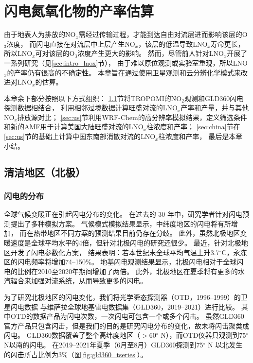 
\chapter{闪电氮氧化物的产率估算} \label{chapter:PE}

由于地表人为排放的NO$_x$需经过传输过程，才能到达自由对流层进而影响该层的O$_3$浓度，
而闪电直接在对流层中上层产生NO$_x$，该层的低温导致LNO$_x$寿命更长，
所以LNO$_x$可对该层的O$_3$浓度产生更大的影响。
然而，尽管前人针对LNO$_x$开展了一系列研究（见\ref{sec:intro_lnox}节），
由于难以原位观测或实验室重现，所以LNO$_x$的产率仍有很高的不确定性。
本章旨在通过使用卫星观测和云分辨化学模式来改进对LNO$_x$的估算。

本章余下部分按照以下方式组织：
\ref{sec:arctic}节将TROPOMI的NO$_2$观测和GLD360闪电探测数据相结合，
利用相邻过境数据计算旺盛对流的LNO$_x$产率和产量，并与其他NO$_x$排放源对比；
\ref{sec:us}节利用WRF-Chem的高分辨率模拟结果，定义筛选条件和新的AMF用于计算美国大陆旺盛对流的LNO$_x$柱浓度和产率；
\ref{sec:china}节在\ref{sec:us}节的基础上计算中国东南部消散对流的LNO$_x$柱浓度和产率，
最后是本章小结。


\section{清洁地区（北极）} \label{sec:arctic}

\subsection{闪电的分布} \label{subsect:lightning_distribution}

全球气候变暖正在引起闪电分布的变化\citep{Reeve.1999,Williams.2005a,Price.2009a}。
在过去的 30 年中，研究学者针对闪电预测提出了多种模拟方案\citep{Price.1992,Price.1997b,Allen.2002,Futyan.2007,Finney.2014,Romps.2014}。
气候模式模拟结果显示，中纬度地区的闪电将有所增加\citep{Michalon.1999,Romps.2014,Luhar.2021}，
而在热带地区不同方案的预测结果目前仍存在分歧\citep{Finney.2018,Romps.2019}。
此外，虽然北极地区变暖速度是全球平均水平的4倍\citep{Rantanen.2022}，但针对北极闪电的研究还很少。
最近，\citet{Chen.2021a}针对北极地区开发了闪电参数化方案，
结果表明：若本世纪末全球平均气温上升3.7$^{\circ}$C，永冻区的闪电频率将增加74--150\%。
地基闪电观测结果显示，北极闪电相对于全球闪电的比例在2010至2020年期间增加了两倍\citep{Holzworth.2021}。
此外，北极地区在夏季将有更多的水汽辐合来加强对流系统，从而导致更多的闪电\citep{Bintanja.2020}。

为了研究北极地区的闪电变化，我们将光学瞬态探测器（OTD，1996--1999）的卫星闪电数据
与维萨拉全球地基雷电数据集（GLD360，2019--2021）进行比较。
其中OTD的数据产品为闪电次数，一次闪电可包含一个或多个闪击。
虽然GLD360官方产品只包含闪击，但是我们的目的是研究闪电分布的变化，故未将闪击聚类成闪电。
GLD360数据覆盖了整个高纬度地区（$>$60$^{\circ}$ N），而OTD仪器只观测到75$^{\circ}$ N以南的闪电。
在2019--2021年夏季（6月至8月）GLD360探测到75$^{\circ}$ N 以北发生的闪击所占比例为3\%（图\ref{fig:gld360_tseries}）。

